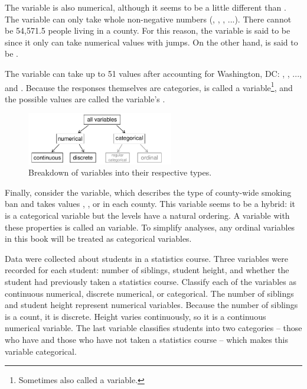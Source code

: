 The  variable is also numerical, although it seems to be a little different than . The variable  can only take whole non-negative numbers (, , , ...). There cannot be 54,571.5 people living in a county. For this reason, the variable  is said to be  since it only can take numerical values with jumps. On the other hand,  is said to be .

The variable  can take up to 51 values after accounting for Washington, DC: , , ..., and . Because the responses themselves are categories,  is called a  variable\footnote{Sometimes also called a  variable.}, and the possible values are called the variable's .

\begin{figure}
\centering
\includegraphics[width=0.57\textwidth]{01/figures/variables/variables}
\caption{Breakdown of variables into their respective types.}
\label{variables}
\end{figure}

Finally, consider the  variable, which describes the type of county-wide smoking ban and takes values , , or  in each county. This variable seems to be a hybrid: it is a categorical variable but the levels have a natural ordering. A variable with these properties is called an  variable. To simplify analyses, any ordinal variables in this book will be treated as categorical variables.

\begin{example}{Data were collected about students in a statistics course. Three variables were recorded for each student: number of siblings, student height, and whether the student had previously taken a statistics course. Classify each of the variables as continuous numerical, discrete numerical, or categorical.}
The number of siblings and student height represent numerical variables. Because the number of siblings is a count, it is discrete. Height varies continuously, so it is a continuous numerical variable. The last variable classifies students into two categories -- those who have and those who have not taken a statistics course -- which makes this variable categorical.
\end{example}


